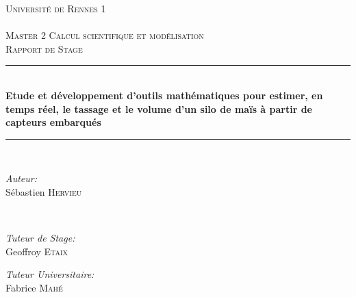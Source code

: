 \documentclass[12pt,a4paper]{report}
\begin{document}
\begin{titlepage}

\newcommand{\HRule}{\rule{\linewidth}{0.5mm}} %

\center %
 

\textsc{\LARGE Université de Rennes 1}\\[1cm] 
\textsc{\Large }\\[0.5cm] %
\textsc{\large Master 2 Calcul scientifique et modélisation}\\
\textsc{Rapport de Stage}\\

\HRule \\[0.4cm]
{ \huge \bfseries Etude et développement d’outils mathématiques pour estimer, en temps réel, le tassage et le volume d’un silo de maïs à partir de capteurs embarqués}\\[0.4cm] 
\HRule \\[1.5cm]
 

\begin{minipage}{0.4\textwidth}
\begin{flushleft} \large
\emph{Auteur:}\\
Sébastien \textsc{Hervieu}
\end{flushleft}
\end{minipage}
~
\begin{minipage}{0.4\textwidth}

\begin{flushright}
	\emph{Tuteur de Stage:} \\
	Geoffroy \textsc{Etaix}
\end{flushright}

\begin{flushright} \large
	\emph{Tuteur Universitaire:} \\
	Fabrice \textsc{Mahé} 
\end{flushright}


\end{minipage}
\end{titlepage}
\end{document}
